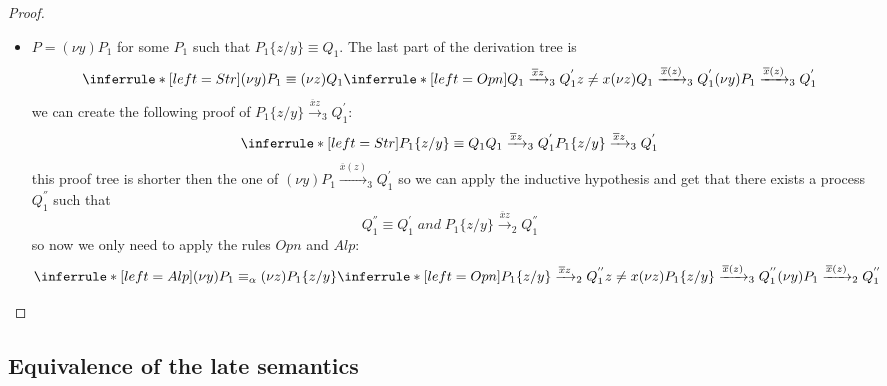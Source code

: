 \begin{theorem}
\begin{proof}
\begin{description}
\begin{description}
\begin{itemize}
\begin{description}
\begin{itemize}
\[{			    \\
			      z\neq x
			  }{
			    (\nu z)P_{1}\xrightarrow{\overline{x}z}_{2}Q_{1}^{''}
			  }
			\]
		      \item
			$P=(\nu y) P_{1}$ for some $P_{1}$ such that $P_{1}\{z/y\}\equiv Q_{1}$. The last part of the derivation tree is 
			\[
			  \inferrule* [left=Str]{
			      (\nu y) P_{1}\equiv (\nu z) Q_{1}
			    \\
			      \inferrule* [left=Opn]{
				  Q_{1} \xrightarrow{\overline{x}z}_{3} Q_{1}^{'}
				\\
				  z\neq x
			      }{
				(\nu z) Q_{1} \xrightarrow{\overline{x}(z)}_{3} Q_{1}^{'}
			      }
			  }{
			    (\nu y) P_{1} \xrightarrow{\overline{x}(z)}_{3} Q_{1}^{'}
			  }
			\]
			we can create the following proof of $P_{1}\{z/y\} \xrightarrow{\overline{x}z}_{3} Q_{1}^{'}$:
			\[
			  \inferrule* [left=Str]{
			      P_{1}\{z/y\}\equiv Q_{1}
			    \\
			      Q_{1} 
				\xrightarrow{\overline{x}z}_{3} 
				  Q_{1}^{'}
			  }{
			    P_{1}\{z/y\} 
			      \xrightarrow{\overline{x}z}_{3} 
				Q_{1}^{'}
			  }
			\]
			this proof tree is shorter then the one of $(\nu y) P_{1} \xrightarrow{\overline{x}(z)}_{3} Q_{1}^{'}$ so we can apply the inductive hypothesis and get that there exists a process $Q_{1}^{''}$ such that
			\[
			  Q_{1}^{''}\equiv Q_{1}^{'}\; and\;
			    P_{1}\{z/y\} 
			      \xrightarrow{\overline{x}z}_{2} 
				Q_{1}^{''} 
			\]
			so now we only need to apply the rules $Opn$ and $Alp$:
			\[
			  \inferrule* [left=Alp]{
			      (\nu y) P_{1}\equiv_{\alpha} (\nu z) P_{1}\{z/y\}
			    \\
			      \inferrule* [left=Opn]{
				  P_{1}\{z/y\} \xrightarrow{\overline{x}z}_{2} Q_{1}^{''}
				\\
				  z\neq x
			      }{
				(\nu z) P_{1}\{z/y\} \xrightarrow{\overline{x}(z)}_{3} Q_{1}^{''}
			      }
			  }{
			    (\nu y) P_{1} \xrightarrow{\overline{x}(z)}_{2} Q_{1}^{''}
			  }
			\]
		  \end{itemize}
		\end{description}
	    \end{itemize}	    
	\end{description}
    \end{description}
  \end{proof}
\end{theorem}



\subsection{Equivalence of the late semantics}



